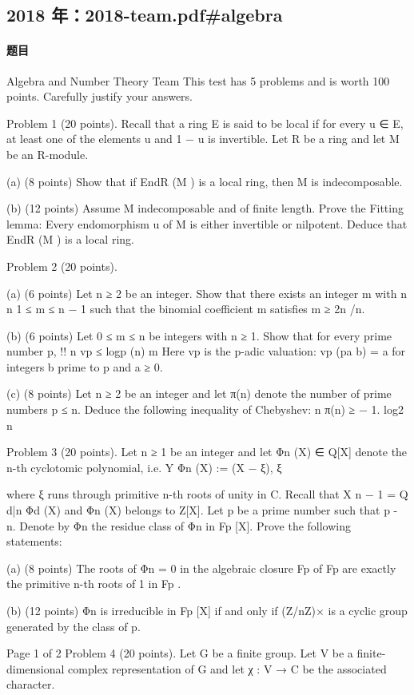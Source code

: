 \documentclass[UTF8,12pt]{ctexart}
\begin{document}
\subsection{2018 年：2018-team.pdf\#algebra}
\paragraph{题目}
Algebra and Number Theory Team This test has 5 problems and is worth 100 points. Carefully justify your answers.

Problem 1 (20 points). Recall that a ring E is said to be local if for every u ∈ E, at least one of the elements u and 1 − u is invertible. Let R be a ring and let M be an R-module.

(a) (8 points) Show that if EndR (M ) is a local ring, then M is indecomposable.

(b) (12 points) Assume M indecomposable and of finite length. Prove the Fitting lemma: Every endomorphism u of M is either invertible or nilpotent. Deduce that EndR (M ) is a local ring.

Problem 2 (20 points).

(a) (6 points) Let n ≥ 2 be an integer. Show that there exists an integer m with n n 1 ≤ m ≤ n − 1 such that the binomial coefficient m satisfies m ≥ 2n /n.

(b) (6 points) Let 0 ≤ m ≤ n be integers with n ≥ 1. Show that for every prime number p, !! n vp ≤ logp (n) m Here vp is the p-adic valuation: vp (pa b) = a for integers b prime to p and a ≥ 0.

(c) (8 points) Let n ≥ 2 be an integer and let π(n) denote the number of prime numbers p ≤ n. Deduce the following inequality of Chebyshev: n π(n) ≥ − 1. log2 n

Problem 3 (20 points). Let n ≥ 1 be an integer and let Φn (X) ∈ Q[X] denote the n-th cyclotomic polynomial, i.e. Y Φn (X) := (X − ξ), ξ

where ξ runs through primitive n-th roots of unity in C. Recall that X n − 1 = Q d|n Φd (X) and Φn (X) belongs to Z[X]. Let p be a prime number such that p - n. Denote by Φn the residue class of Φn in Fp [X]. Prove the following statements:

(a) (8 points) The roots of Φn = 0 in the algebraic closure Fp of Fp are exactly the primitive n-th roots of 1 in Fp .

(b) (12 points) Φn is irreducible in Fp [X] if and only if (Z/nZ)× is a cyclic group generated by the class of p.

Page 1 of 2 Problem 4 (20 points). Let G be a finite group. Let V be a finite-dimensional complex representation of G and let χ : V → C be the associated character.
\end{document}
